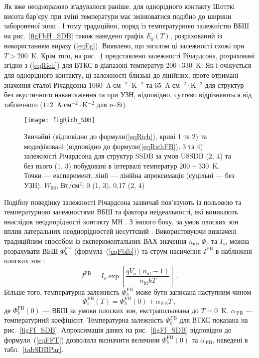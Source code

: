 Як вже неодноразово згадувалося раніше, для однорідного контакту Шотткі висота бар'єру при зміні температури має змінюватися подібно
до ширини забороненої зони \cite{Rhoderick1988,Aboelfotoh,Zhua}.
І тому традиційно, поряд із температурною залежністю ВБШ на рис.~\ref{figFbH_SDB} також наведено графік $E_g(T)$,
розрахований із використанням виразу (\ref{eqEg}).
Виявлено, що загалом ці залежності схожі при $T>200$~K.
Крім того, на рис.~\ref{figRich_SDB} представлено залежності Річардсона, розраховані згідно з
(\ref{eqRich}) для ВТКС в діапазоні температур 200$\div$330~K.
Як і очікується для однорідного контакту, ці залежності близькі до лінійних,
проте отримані значення сталої Річардсона $1060$~A$\cdot$см$^{-2}\cdot$K$^{-2}$ та $65$~A$\cdot$см$^{-2}\cdot$K$^{-2}$
для структур без акустичного навантаження та при УЗН, відповідно, суттєво відрізняються
від табличного ($112$~A$\cdot$см$^{-2}\cdot$K$^{-2}$ для $n$--Si).


\begin{figure}
\center
\texttt{[image: figRich\_SDB]}
\caption{\label{figRich_SDB}
Звичайні (відповідно до формули(\ref{eqRich}), криві 1 та 2)
та модифіковані (відповідно до формули(\ref{eqRichFB}), 3 та 4)
залежності Річардсона для структур SSDB за умов U8SDB (2, 4) та без нього (1, 3) побудовані в інтервалі
температур $200\div330$~K.
Точки --- експеримент, лінії --- лінійна апроксимація (суцільні --- без УЗН).
$W_\mathtt{US}$,  Вт/см$^2$: 0 (1, 3), 0,17 (2, 4)
}%
\end{figure}

Подібну поведінку залежності Річардсона зазвичай пов'язують із польовою та температурною залежностями ВБШ та фактора неідеальності,
які виникають внаслідок неоднорідності контакту МН \cite{Sarpatwari,Aldemir}.
З іншого боку, за умов плоских зон вплив латеральних неоднорідностей несуттєвий \cite{Aldemir,Unewisse,Korkut}.
Використовуючи визначені традиційним способом із експериментальних ВАХ значення $n_\mathrm{id}$, $\Phi_b$ та $I_s$,
можна розрахувати ВБШ $\Phi_{b}^\mathrm{FB}$ (формула~(\ref{eqFbfb})) та струм насичення $I^\mathrm{FB}$ в наближені плоских зон \cite{Aldemir,Unewisse,Korkut}:
\begin{equation}\label{eqIfb}
I^\mathrm{FB}=I_s\exp\left[\frac{qV_n(n_\mathrm{id}-1)}{n_\mathrm{id}kT}\right]\,.
\end{equation}
Більше того, температурна залежність $\Phi_{b}^\mathrm{FB}$ може бути записана наступним чином
\begin{equation}
\label{eqFFT}
\Phi_{b}^\mathrm{FB}(T)=\Phi_{b}^\mathrm{FB}(0)+\alpha_\mathrm{\,FB} T \,,
\end{equation}
де
$\Phi_{b}^\mathrm{FB}(0)$ --- ВБШ за умови плоских зон, екстрапольована до $T = 0$~K,
$\alpha_\mathrm{\,FB}$ --- температурний коефіцієнт.
Температурна залежність $\Phi_{b}^\mathrm{FB}$ для ВТКС показана на рис.~\ref{figFf_SDB}.
Апроксимація даних на рис.~\ref{figFf_SDB} відповідно до формули~(\ref{eqFFT}) дозволила
визначити величини  $\Phi_{b}^\mathrm{FB}(0)$ та $\alpha_\mathrm{\,FB}$,
наведені в табл.~\ref{tabSDBPar}.



